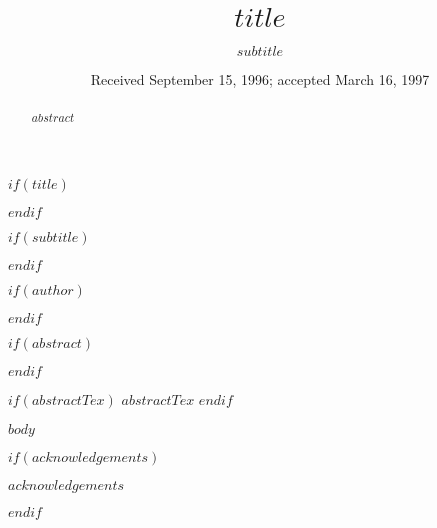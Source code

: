 \documentclass{aa}
\begin{document}
$if(title)$
  \title{$title$}
$endif$

$if(subtitle)$
  \subtitle{$subtitle$}
$endif$

$if(author)$


$endif$

   \date{Received September 15, 1996; accepted March 16, 1997}


$if(abstract)$
\begin{abstract}
  $abstract$
\end{abstract}
$endif$

$if(abstractTex)$
 $abstractTex$
$endif$


   \maketitle
%

$body$

$if(acknowledgements)$
\begin{acknowledgements}
$acknowledgements$
\end{acknowledgements}
$endif$
\end{document}
